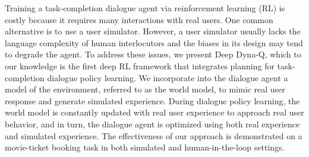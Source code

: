 Training a task-completion dialogue agent via reinforcement learning (RL) is costly because it requires many interactions with real users. One common alternative is to use a user simulator. However, a user simulator usually lacks the language complexity of human interlocutors and the biases in its design may tend to degrade the agent. To address these issues, we present Deep Dyna-Q, which to our knowledge is the first deep RL framework that integrates planning for task-completion dialogue policy learning. We incorporate into the dialogue agent a model of the environment, referred to as the world model, to mimic real user response and generate simulated experience. During dialogue policy learning, the world model is constantly updated with real user experience to approach real user behavior, and in turn, the dialogue agent is optimized using both real experience and simulated experience. The effectiveness of our approach is demonstrated on a movie-ticket booking task in both simulated and human-in-the-loop settings.
